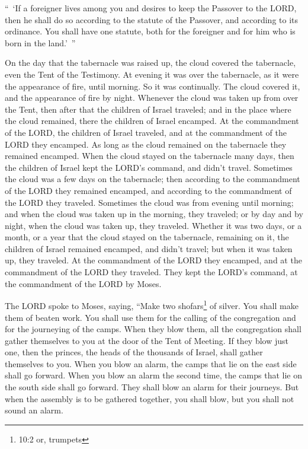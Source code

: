 \myverse{}“ ‘If a foreigner lives among you and desires to keep the Passover
to the LORD, then he shall do so according to the statute of the Passover, and according to its ordinance.
You shall have one statute, both for the foreigner and for him who is born in the land.’ ”


\myverse{}On the day that the tabernacle was raised up, the cloud covered
the tabernacle, even the Tent of the Testimony. At evening it was over the tabernacle, as it were the
appearance of fire, until morning.
\myverse{}So it was continually. The cloud covered it, and the appearance of fire by
night.
\myverse{}Whenever the cloud was taken up from over the Tent, then after that the children
of Israel traveled; and in the place where the cloud remained, there the children of Israel encamped.
\myverse{}At the commandment of the LORD, the children of Israel traveled, and at the
commandment of the LORD they encamped. As long as the cloud remained on the tabernacle they remained encamped.
\myverse{}When the cloud stayed on the tabernacle many days, then the children of Israel
kept the LORD’s command, and didn’t travel.
\myverse{}Sometimes the cloud was a few days on the tabernacle; then according to the
commandment of the LORD they remained encamped, and according to the commandment of the LORD they traveled.
\myverse{}Sometimes the cloud was from evening until morning; and when the cloud was
taken up in the morning, they traveled; or by day and by night, when the cloud was taken up, they traveled.
\myverse{}Whether it was two days, or a month, or a year that the cloud stayed on the
tabernacle, remaining on it, the children of Israel remained encamped, and didn’t travel; but when it
was taken up, they traveled.
\myverse{}At the commandment of the LORD they encamped, and at the commandment of the
LORD they traveled. They kept the LORD’s command, at the commandment of the LORD by Moses.


\mychapter{} \myverse*{}The LORD spoke to Moses, saying,
\myverse{}“Make two shofars\footnote{ 10:2 or, trumpets} of silver. You shall make them
of beaten work. You shall use them for the calling of the congregation and for the journeying of the camps.
\myverse{}When they blow them, all the congregation shall gather themselves to you at
the door of the Tent of Meeting.
\myverse{}If they blow just one, then the princes, the heads of the thousands of Israel,
shall gather themselves to you.
\myverse{}When you blow an alarm, the camps that lie on the east side shall go forward.
\myverse{}When you blow an alarm the second time, the camps that lie on the south side
shall go forward. They shall blow an alarm for their journeys.
\myverse{}But when the assembly is to be gathered together, you shall blow, but you shall
not sound an alarm.


